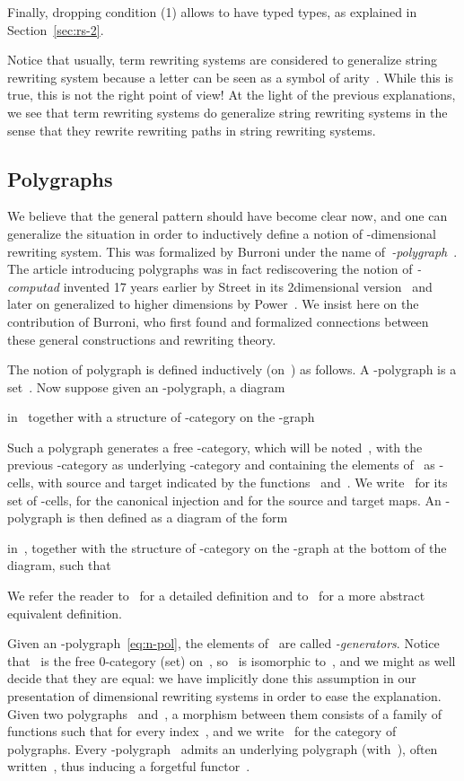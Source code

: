 \documentclass{LMCS}
\begin{document}
Finally, dropping condition (1) allows to have typed types, as explained in
Section~\ref{sec:rs-2}.

Notice that usually, term rewriting systems are considered to generalize string
rewriting system because a letter can be seen as a symbol of arity~. While
this is true, this is not the right point of view! At the light of the previous
explanations, we see that term rewriting systems do generalize string rewriting
systems in the sense that they rewrite rewriting paths in string rewriting systems.

\subsection{Polygraphs}
\label{sec:polygraphs}
We believe that the general pattern should have become clear now, and one can
generalize the situation in order to inductively define a notion of
-dimensional rewriting system. This was formalized by Burroni under the name
of~\emph{-polygraph}~\cite{burroni:higher-word}. The article introducing
polygraphs was in fact rediscovering the notion of \emph{-computad} invented
17 years earlier by Street in its 2\nbd{}dimensional
version~\cite{street:limit-indexed-by-functors} and later on generalized to
higher dimensions by Power~\cite{power:n-cat-pasting}. We insist here on the
contribution of Burroni, who first found and formalized connections between
these general constructions and rewriting theory.

The notion of \nbd{}polygraph is defined inductively (on~) as
follows. A -polygraph is a set~. Now suppose given an -polygraph, \ie
a diagram

in~ together with a structure of -category on the -graph

Such a polygraph generates a free -category, which will be noted~, with
the previous -category as underlying -category and containing the
elements of~ as -cells, with source and target indicated by the
functions~ and~. We write~ for its set of -cells,
 for the canonical injection and  for the source and target maps. An -polygraph is then defined
as a diagram of the form

in~, together with the structure of -category on the -graph at the
bottom of the diagram, such that

We refer the reader to~\cite{burroni:higher-word} for a detailed definition and
to~\cite{guiraud-malbos:higher-cat-fdt} for a more abstract equivalent
definition.

Given an -polygraph~\eqref{eq:n-pol}, the elements of~ are called
\emph{-generators}. Notice that~ is the free 0-category (\ie set)
on~, so~ is isomorphic to~, and we might as well decide that
they are equal: we have implicitly done this assumption in our presentation of
\nbd{}dimensional rewriting systems in order to ease the explanation. Given
two \nbd{}polygraphs~ and~, a morphism between them consists of a
family \hbox{} of functions such that
 for every index~, and we write~
for the category of \nbd{}polygraphs. Every -polygraph~ admits an
underlying \nbd{}polygraph (with~), often written~,
thus inducing a forgetful functor~.
\end{document}
